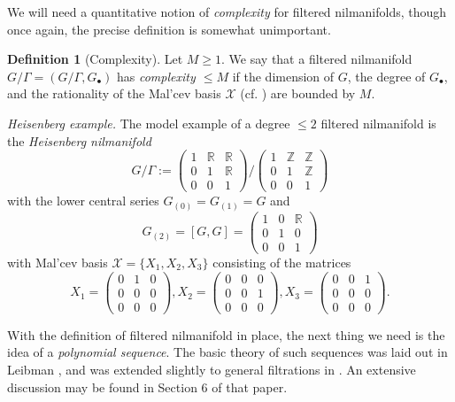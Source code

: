 \documentclass[11pt,reqno]{amsart}
\numberwithin{equation}{section}
\theoremstyle{plain}
\theoremstyle{definition}
\newtheorem{definition}[subsection]{Definition}
\renewcommand{\leq}{\leqslant}
\renewcommand{\geq}{\geqslant}
\newcommand\Z{\mathbb{Z}}
\newcommand\R{\mathbb{R}}
\newcommand\1{{\bf 1}}
\newcommand\2{{\bf 2}}
\begin{document}
We will need a quantitative notion of \emph{complexity} for filtered nilmanifolds, though once again, the precise definition is somewhat unimportant. 

\begin{definition}[Complexity] Let $M \geq 1$.  We say that a filtered nilmanifold $G/\Gamma = (G/\Gamma,G_\bullet)$ has \emph{complexity $\leq M$} if the dimension of $G$, the degree of $G_\bullet$, and the rationality of the Mal'cev basis $\mathcal{X}$ (cf. \cite[Definition 2.4]{green-tao-nilratner}) are bounded by $M$.
\end{definition}

\emph{Heisenberg example.} The model example of a degree $\leq 2$ filtered nilmanifold is the \emph{Heisenberg nilmanifold}
$$ G/\Gamma := \left( \begin{smallmatrix} 1 & \R & \R \\ 0 & 1 & \R \\ 0 & 0 & 1 \end{smallmatrix} \right)/
\left(\begin{smallmatrix} 1 & \Z & \Z \\ 0 & 1 & \Z \\ 0 & 0 & 1 \end{smallmatrix}\right)$$
with the lower central series $G_{(0)}=G_{(1)} = G$ and
$$ G_{(2)} = [G,G] = \left(\begin{smallmatrix} 1 & 0 & \R \\ 0 & 1 & 0 \\ 0 & 0 & 1 \end{smallmatrix} \right)$$
with Mal'cev basis $\mathcal{X} = \{X_1,X_2,X_3\}$ consisting of the matrices
$$ X_1 = \left(\begin{smallmatrix} 0 & 1 & 0 \\ 0 & 0 & 0 \\ 0 & 0 & 0 \end{smallmatrix}\right), X_2 = \left(\begin{smallmatrix} 0 & 0 & 0 \\ 0 & 0 & 1 \\ 0 & 0 & 0 \end{smallmatrix}\right), X_3 = \left(\begin{smallmatrix} 0 & 0 & 1 \\ 0 & 0 & 0 \\ 0 & 0 & 0 \end{smallmatrix}\right).$$

With the definition of filtered nilmanifold in place, the next thing we need is the idea of a \emph{polynomial sequence}. The basic theory of such sequences was laid out in Leibman \cite{leibman-group-1}, and was extended slightly to general filtrations in \cite{green-tao-nilratner}. An extensive discussion may be found in Section 6 of that paper.
\end{document}
